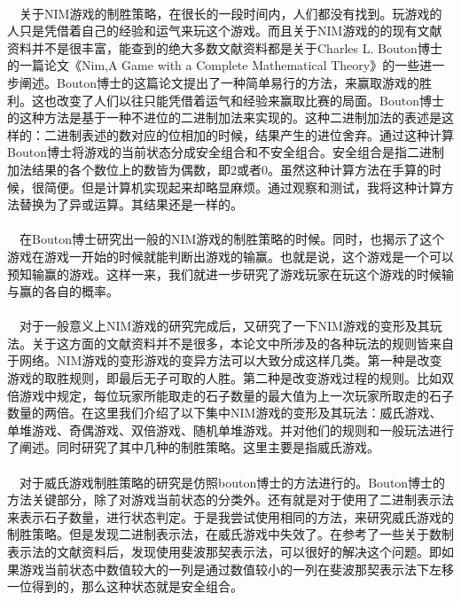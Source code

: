 \documentclass[UTF8,nofonts,cs4size]{ctexrep}
\begin{document}
\paragraph{}
\indent \ \ 
关于NIM游戏的制胜策略，在很长的一段时间内，人们都没有找到。玩游戏的人只是凭借着自己的经验和运气来玩这个游戏。而且关于NIM游戏的的现有文献资料并不是很丰富，能查到的绝大多数文献资料都是关于Charles L. Bouton博士的一篇论文《Nim,A Game with a Complete Mathematical Theory》的一些进一步阐述。Bouton博士的这篇论文提出了一种简单易行的方法，来赢取游戏的胜利。这也改变了人们以往只能凭借着运气和经验来赢取比赛的局面。Bouton博士的这种方法是基于一种不进位的二进制加法来实现的。这种二进制加法的表述是这样的：二进制表述的数对应的位相加的时候，结果产生的进位舍弃。通过这种计算Bouton博士将游戏的当前状态分成安全组合和不安全组合。安全组合是指二进制加法结果的各个数位上的数皆为偶数，即2或者0。虽然这种计算方法在手算的时候，很简便。但是计算机实现起来却略显麻烦。通过观察和测试，我将这种计算方法替换为了异或运算。其结果还是一样的。
\paragraph{}
\indent \ \ 
在Bouton博士研究出一般的NIM游戏的制胜策略的时候。同时，也揭示了这个游戏在游戏一开始的时候就能判断出游戏的输赢。也就是说，这个游戏是一个可以预知输赢的游戏。这样一来，我们就进一步研究了游戏玩家在玩这个游戏的时候输与赢的各自的概率。
\paragraph{}
\indent \ \ 
对于一般意义上NIM游戏的研究完成后，又研究了一下NIM游戏的变形及其玩法。关于这方面的文献资料并不是很多，本论文中所涉及的各种玩法的规则皆来自于网络。NIM游戏的变形游戏的变异方法可以大致分成这样几类。第一种是改变游戏的取胜规则，即最后无子可取的人胜。第二种是改变游戏过程的规则。比如双倍游戏中规定，每位玩家所能取走的石子数量的最大值为上一次玩家所取走的石子数量的两倍。在这里我们介绍了以下集中NIM游戏的变形及其玩法：威氏游戏、单堆游戏、奇偶游戏、双倍游戏、随机单堆游戏。并对他们的规则和一般玩法进行了阐述。同时研究了其中几种的制胜策略。这里主要是指威氏游戏。
\paragraph{}
\indent \ \ 
对于威氏游戏制胜策略的研究是仿照bouton博士的方法进行的。Bouton博士的方法关键部分，除了对游戏当前状态的分类外。还有就是对于使用了二进制表示法来表示石子数量，进行状态判定。于是我尝试使用相同的方法，来研究威氏游戏的制胜策略。但是发现二进制表示法，在威氏游戏中失效了。在参考了一些关于数制表示法的文献资料后，发现使用斐波那契表示法，可以很好的解决这个问题。即如果游戏当前状态中数值较大的一列是通过数值较小的一列在斐波那契表示法下左移一位得到的，那么这种状态就是安全组合。
\end{document}
